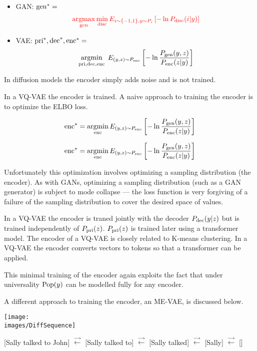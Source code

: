 {\begin{itemize}
\vfill
\item GAN: $\mathrm{gen}^* =$
$${\color{red} \operatorname*{argmax}_{\mathrm{gen}} \min_{\mathrm{disc}} E_{i \sim \{-1,1\}, y \sim P_i}\left[-\ln P_{\mathrm{disc}}(i|y)\right]}$$

\vfill
\item VAE: $\mathrm{pri}^*,\mathrm{dec}^*,\mathrm{enc}^* =$
{\color{red} $$\operatorname*{argmin}_{\mathrm{pri},\mathrm{dec},\mathrm{enc}}\;E_{(y,z) \sim P_{\mathrm{enc}}}\left[ - \ln \frac{P_{\mathrm{gen}}(y,z)}{P_{\mathrm{enc}}(z|y)}\right]$$}
\end{itemize}


In diffusion models the encoder simply adds noise and is not trained.

\vfill
In a VQ-VAE the encoder is trained. A naive approach to training the encoder is to optimize the ELBO loss.

{\color{red} $$\mathrm{enc}^* = \operatorname*{argmin}_{\mathrm{enc}} E_{(y,z) \sim P_{\mathrm{enc}}}\left[ - \ln \frac{P_{\mathrm{gen}}(y,z)}{P_{\mathrm{enc}}(z|y)}\right]$$}


{\color{red} $$\mathrm{enc}^* = \operatorname*{argmin}_{\mathrm{enc}} E_{(y,z) \sim P_{\mathrm{enc}}}\left[ - \ln \frac{P_{\mathrm{gen}}(y,z)}{P_{\mathrm{enc}}(z|y)}\right]$$}

\vfill
Unfortunately this optimization involves optimizing a sampling distribution (the encoder).  As with GANs,
optimizing a sampling distribution (such as a GAN generator) is subject to mode collapse --- the loss
function is very forgiving of a failure of the sampling distribution to cover the desired space of
values.


In a VQ-VAE the encoder is traned jointly with the decoder $P_{\mathrm{dec}}(y|z)$ but is trained independently of $P_{\mathrm{pri}}(z)$.  $P_{\mathrm{pri}}(z)$ is trained later using a transformer model.
The encoder of a VQ-VAE is closely related to K-means clustering.   In a VQ-VAE the encoder converts vectors to tokens
so that a transformer can be applied.

\vfill
This minimal training of the encoder again exploits the fact that under universality $\mathrm{Pop}(y)$ can be modelled fully for any encoder.


\vfill
A different approach to training the encoder, an ME-VAE, is discussed below.



\centerline{\texttt{[image: \\images/DiffSequence]}}

\vfill
{\huge
\centerline{{\color{red} [Sally talked to John]} $\stackrel{\rightarrow}{\leftarrow}$ {\color{red} [Sally talked to]}
$\stackrel{\rightarrow}{\leftarrow}$ {\color{red}[Sally talked]} $\stackrel{\rightarrow}{\leftarrow}$ {\color{red}[Sally]} $\stackrel{\rightarrow}{\leftarrow}$ {\color{red} []}}
}

}
